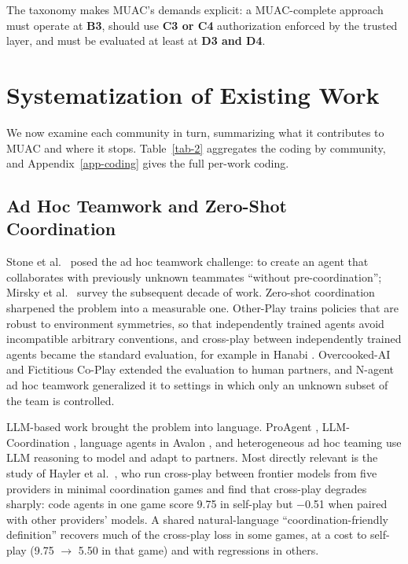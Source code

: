 \documentclass[conference]{IEEEtran}
\begin{document}
The taxonomy makes MUAC's demands explicit: a MUAC-complete approach must operate at \textbf{B3}, should use \textbf{C3 or C4} authorization enforced by the trusted layer, and must be evaluated at least at \textbf{D3 and D4}.

\section{Systematization of Existing Work}\label{sec-6}

We now examine each community in turn, summarizing what it contributes to MUAC and where it stops. Table~\ref{tab-2} aggregates the coding by community, and Appendix~\ref{app-coding} gives the full per-work coding.

\subsection{Ad Hoc Teamwork and Zero-Shot Coordination}\label{sec-6-1}

Stone et al.~\cite{stone2010adhoc} posed the ad hoc teamwork challenge: to create an agent that collaborates with previously unknown teammates ``without pre-coordination''; Mirsky et al.~\cite{mirsky2022survey} survey the subsequent decade of work. Zero-shot coordination sharpened the problem into a measurable one. Other-Play \cite{hu2020otherplay} trains policies that are robust to environment symmetries, so that independently trained agents avoid incompatible arbitrary conventions, and cross-play between independently trained agents became the standard evaluation, for example in Hanabi \cite{bard2020hanabi}. Overcooked-AI \cite{carroll2019overcooked} and Fictitious Co-Play \cite{strouse2021fcp} extended the evaluation to human partners, and N-agent ad hoc teamwork \cite{wang2024naht, wang2025matnaht, wang2025shapley} generalized it to settings in which only an unknown subset of the team is controlled.

LLM-based work brought the problem into language. ProAgent \cite{zhang2024proagent}, LLM-Coordination \cite{agashe2023llmcoord}, language agents in Avalon \cite{shi2023avalon}, and heterogeneous ad hoc teaming \cite{liu2024heteroaht, wallace2025recollab} use LLM reasoning to model and adapt to partners. Most directly relevant is the study of Hayler et al.~\cite{hayler2026zsc}, who run cross-play between frontier models from five providers in minimal coordination games and find that cross-play degrades sharply: code agents in one game score 9.75 in self-play but $-$0.51 when paired with other providers' models. A shared natural-language ``coordination-friendly definition'' recovers much of the cross-play loss in some games, at a cost to self-play (9.75 $\rightarrow$ 5.50 in that game) and with regressions in others.
\end{document}
